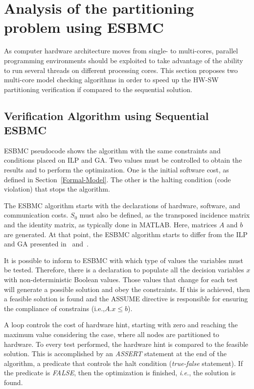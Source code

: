 \section{Analysis of the partitioning problem using ESBMC}
\label{Analysis-of-the-partitioning-problem-using-ESBMC}

As computer hardware architecture moves from single- to multi-cores, parallel programming environments should be exploited to take advantage of the ability to run several threads on different processing cores. This section proposes two multi-core model checking algorithms in order to speed up the HW-SW partitioning verification if compared to the sequential solution.

\subsection{Verification Algorithm using Sequential ESBMC}
\label{Verification-Algorithm-using-ESBMC}

ESBMC pseudocode shows the algorithm with the same constraints and conditions placed on ILP and GA. Two values must be controlled to obtain the results and to perform the optimization. One is the initial software cost, as defined in Section~\ref{Formal-Model}. The other is the halting condition (code violation) that stops the algorithm.

The ESBMC algorithm starts with the declarations of hardware, software, and communication costs. $S_0$ must also be defined, as the transposed incidence matrix and the identity matrix, as typically done in MATLAB. Here, matrices $A$ and $b$ are generated. At that point, the ESBMC algorithm starts to differ from the ILP and GA presented in~\cite{Trindade2015} and~\cite{Trindade2014}.

It is possible to inform to ESBMC with which type of values the variables must be tested. Therefore, there is a declaration to populate all the decision variables $x$ with non-deterministic Boolean values. Those values that change for each test will generate a possible solution and obey the constraints. If this is achieved, then a feasible solution is found and the ASSUME directive is responsible for ensuring the compliance of constrains (i.e.,$A.x \leq b$).

A loop controls the cost of hardware hint, starting with zero and reaching the maximum value considering the case, where all nodes are partitioned to hardware. To every test performed, the hardware hint is compared to the feasible solution. This is accomplished by an \textit{ASSERT} statement at the end of the algorithm, a predicate that controls the halt condition (\textit{true-false} statement). If the predicate is \textit{FALSE}, then the optimization is finished, {\it i.e.}, the solution is found. 

